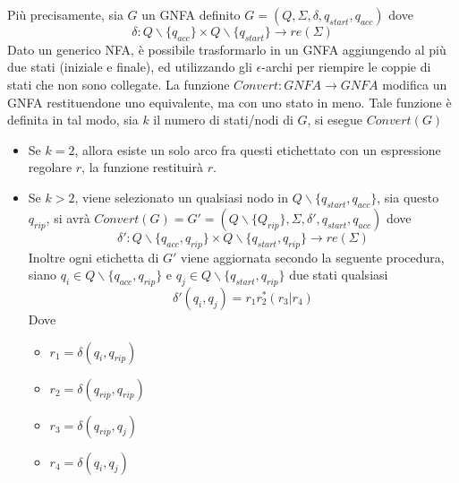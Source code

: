 \documentclass[10pt, letterpaper]{report}
\begin{document}
Più precisamente, sia $G$ un GNFA definito $G=(Q,\Sigma,\delta,q_{start},q_{acc})$ dove 
$$ \delta : Q\backslash \{q_{acc}\} \times Q\backslash \{q_{start}\}\rightarrow re(\Sigma)$$
Dato un generico NFA, è possibile trasformarlo in un GNFA aggiungendo al più due stati (iniziale e 
finale), ed utilizzando gli $\epsilon$-archi per riempire le coppie di stati che non sono collegate.\acc 
La funzione $Convert : GNFA \rightarrow GNFA$ modifica un GNFA restituendone uno equivalente, ma con uno stato in meno. 
Tale funzione è definita in tal modo, sia $k$ il numero di stati/nodi di $G$, si esegue $Convert(G)$ \begin{itemize}
    \item Se $k=2$, allora esiste un solo arco fra questi etichettato con un espressione regolare $r$, la funzione 
    restituirà $r$. 
    \item Se $k> 2$, viene selezionato un qualsiasi nodo in $Q\backslash\{q_{start},q_{acc}\}$, sia questo $q_{rip}$, 
    si avrà $Convert(G)=G'=(Q\backslash\{Q_{rip}\},\Sigma,\delta',q_{start},q_{acc})$ dove 
    $$ \delta' : Q\backslash \{q_{acc},q_{rip}\} \times Q\backslash \{q_{start},q_{rip}\}\rightarrow re(\Sigma)$$
    Inoltre ogni etichetta di $G'$ viene aggiornata secondo la seguente procedura, siano $q_i\in Q\backslash \{q_{acc},q_{rip}\}$
    e  $q_j\in Q\backslash \{q_{start},q_{rip}\}$ due stati qualsiasi 
    $$ \delta'(q_i,q_j)=r_1r_2^*(r_3|r_4)$$
    Dove \begin{itemize}
        \item $r_1=\delta(q_i,q_{rip})$
        \item $r_2=\delta(q_{rip},q_{rip})$
        \item $r_3=\delta(q_{rip},q_j)$
        \item $r_4=\delta(q_i,q_j)$
    \end{itemize}
\end{itemize}
\begin{figure}[h!]
    \centering
\end{figure}
\end{document}
